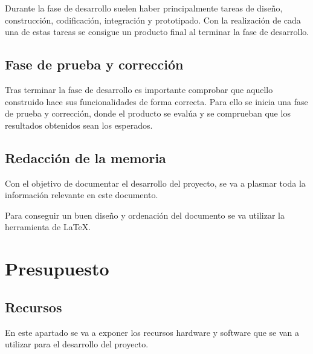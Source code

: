 Durante la fase de desarrollo suelen haber principalmente tareas de diseño, construcción, codificación, integración y prototipado. Con la realización de cada una de estas tareas se consigue un producto final al terminar la fase de desarrollo. 

\subsection{Fase de prueba y corrección}

Tras terminar la fase de desarrollo es importante comprobar que aquello construido hace sus funcionalidades de forma correcta. Para ello se inicia una fase de prueba y corrección, donde el producto se evalúa y se comprueban que los resultados obtenidos sean los esperados. 

\subsection{Redacción de la memoria}

Con el objetivo de documentar el desarrollo del proyecto, se va a plasmar toda la información relevante en este documento. 

Para conseguir un buen diseño y ordenación del documento se va utilizar la herramienta de LaTeX. 

\newpage

\section{Presupuesto}

\subsection{Recursos}

En este apartado se va a exponer los recursos hardware y software que se van a utilizar para el desarrollo del proyecto. 

